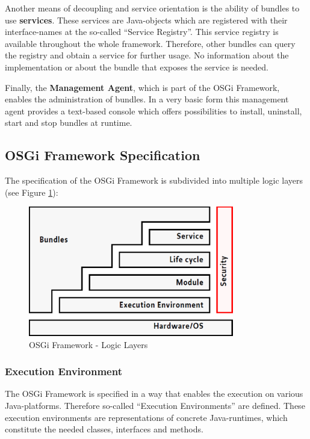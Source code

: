 Another means of decoupling and service orientation is the ability of bundles to
use \textbf{services}. These services are Java-objects which are registered with
their interface-names at the so-called ``Service Registry''. This service
registry is available throughout the whole framework. Therefore, other bundles
can query the registry and obtain a service for further usage. No information
about the implementation or about the bundle that exposes the service is needed.

Finally, the \textbf{Management Agent}, which is part of the OSGi Framework,
enables the administration of bundles. In a very basic form this management agent
provides a text-based console which offers possibilities to install, uninstall,
start and stop bundles at runtime.

\subsection{OSGi Framework Specification}
The specification of the OSGi Framework is subdivided into multiple logic layers
(see Figure \ref{fig:osgi_framework_logic_layers}):

\begin{figure}
	\centering
		\includegraphics[width=0.8\textwidth]{Bilder/osgi-framework.pdf}
	\caption{OSGi Framework - Logic Layers}
	\label{fig:osgi_framework_logic_layers}
\end{figure}

\subsubsection{Execution Environment}
The OSGi Framework is specified in a way that enables the execution on various
Java-platforms. Therefore so-called ``Execution Environments'' are defined. These
execution environments are representations of concrete Java-runtimes, which
constitute the needed classes, interfaces and methods.

